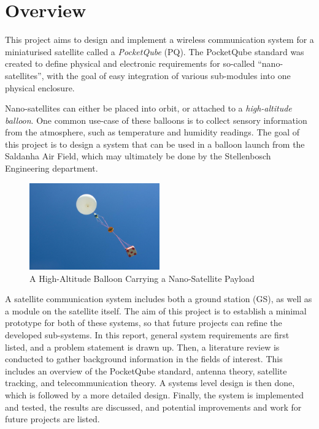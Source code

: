 \graphicspath{{./figures}}

\section{Overview}

This project aims to design and implement a wireless communication system for a miniaturised satellite called a \textit{PocketQube} (PQ). The PocketQube standard was created to define physical and electronic requirements for so-called ``nano-satellites'', with the goal of easy integration of various sub-modules into one physical enclosure.

Nano-satellites can either be placed into orbit, or attached to a \textit{high-altitude balloon}. One common use-case of these balloons is to collect sensory information from the atmosphere, such as temperature and humidity readings. The goal of this project is to design a system that can be used in a balloon launch from the Saldanha Air Field, which may ultimately be done by the Stellenbosch Engineering department.

\begin{figure}[!htb]
  \centering
  \includegraphics[width=0.5\textwidth]{balloonSat}
  \caption{A High-Altitude Balloon Carrying a Nano-Satellite Payload \cite{site-cyberBalloonLaunch}}
  \label{fig:balloonSat}
\end{figure}

A satellite communication system includes both a ground station (GS), as well as a module on the satellite itself. The aim of this project is to establish a minimal prototype for both of these systems, so that future projects can refine the developed sub-systems. In this report, general system requirements are first listed, and a problem statement is drawn up. Then, a literature review is conducted to gather background information in the fields of interest. This includes an overview of the PocketQube standard, antenna theory, satellite tracking, and telecommunication theory. A systems level design is then done, which is followed by a more detailed design. Finally, the system is implemented and tested, the results are discussed, and potential improvements and work for future projects are listed.